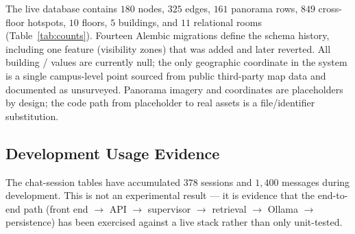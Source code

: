 The live database contains $180$ nodes, $325$ edges, $161$ panorama rows,
$849$ cross-floor hotspots, $10$ floors, $5$ buildings, and $11$ relational
rooms (Table~\ref{tab:counts}). Fourteen Alembic migrations define the
schema history, including one feature (visibility zones) that was added and
later reverted. All building / values are
currently null; the only geographic coordinate in the system is a single
campus-level point sourced from public third-party map data and documented
as unsurveyed. Panorama imagery and coordinates are placeholders by design;
the code path from placeholder to real assets is a file/identifier
substitution.

\subsection{Development Usage Evidence}
The chat-session tables have accumulated $378$ sessions and $1{,}400$
messages during development. This is not an experimental result --- it is
evidence that the end-to-end path (front end $\to$ API $\to$ supervisor
$\to$ retrieval $\to$ Ollama $\to$ persistence) has been exercised against
a live stack rather than only unit-tested.
